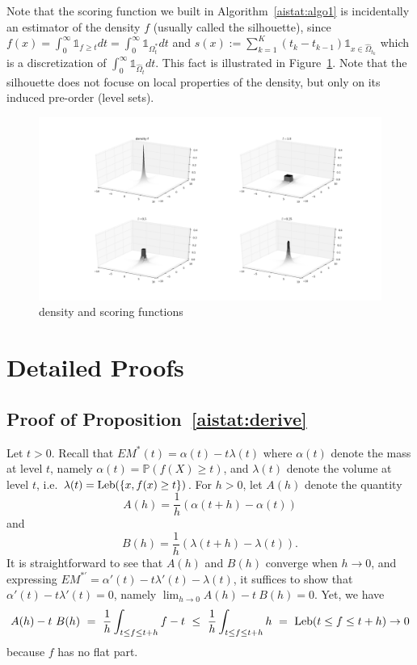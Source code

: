 Note that the scoring function we built in Algorithm~\ref{aistat:algo1} is incidentally an estimator of the density $f$ (usually called the silhouette), since $f(x)=\int_{0}^\infty \mathds{1}_{f \ge t}dt=\int_{0}^\infty \mathds{1}_{\Omega^*_t}dt$ and $s(x):= \sum_{k=1}^K (t_k-t_{k-1}) \mathds{1}_{x \in \hat{\Omega}_{t_k} }$ which is a discretization of $\int_{0}^\infty \mathds{1}_{\hat \Omega_t}dt$. This fact is illustrated in Figure~\ref{aistat:scoring3D}. Note that the silhouette does not focuse on local properties of the density, but only on its induced pre-order (level sets).
\begin{figure}[!h!]
\centering
\includegraphics[width=\linewidth]{fig_source/scoring3D.png}
\caption{density and scoring functions} %
\label{aistat:scoring3D}
\end{figure}






\section{Detailed Proofs}
\label{aistat:sec:detailed_proofs}
\subsection*{Proof of Proposition~\ref{aistat:derive}} Let $t>0$. Recall that $EM^{*}(t)=\alpha(t)-t \lambda(t)$ where $\alpha(t)$ denote the mass at level $t$, namely $\alpha(t)=\mathbb{P}(f(X) \ge t)$, and $\lambda(t)$ denote the volume at level $t$, i.e. $\lambda(t)=\text{Leb}(\{x, f(x) \ge t\})$. For $h>0$, let $A(h)$ denote the quantity $$A(h)=\frac{1}{h}(\alpha(t+h)-\alpha(t))$$ and $$B(h)=\frac{1}{h} (\lambda(t+h)-\lambda(t)).$$ It is straightforward to see that $A(h)$ and $B(h)$ converge when $h \rightarrow 0$, and expressing $EM^{*'}=\alpha'(t)-t\lambda'(t)-\lambda(t)$, it suffices to show that $\alpha'(t)-t\lambda'(t)=0$, namely $\lim_{h \rightarrow 0} A(h) - t~B(h) = 0$. Yet, we have $$A(h)-t~B(h)~=~\frac{1}{h} \int_{t \le f \le t+h}f-t ~\le~ \frac{1}{h} \int_{t \le f \le t+h} h  ~=~ \text{Leb}(t \le f \le t+h) \rightarrow 0$$ because $f$ has no flat part.



